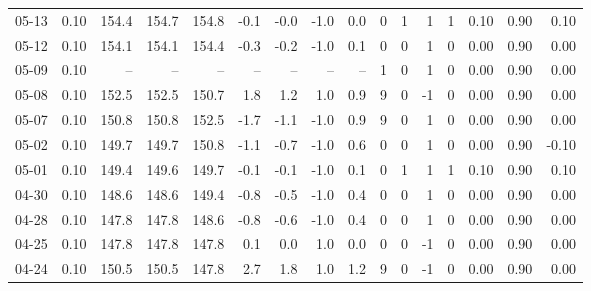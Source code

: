 \begin{threeparttable}
{\begin{tabular}{lrrrrrrrrrrrrrrr}
  05-13 &     0.10 & 154.4 & 154.7 & 154.8 &       -0.1 &           -0.0 &                     -1.0 &                 0.0 &              0 &         1 &     1 &         1 &       0.10 &      0.90 &           0.10 \\
  05-12 &     0.10 & 154.1 & 154.1 & 154.4 &       -0.3 &           -0.2 &                     -1.0 &                 0.1 &              0 &         0 &     1 &         0 &       0.00 &      0.90 &           0.00 \\
  05-09 &     0.10 &    -- &    -- &    -- &         -- &             -- &                       -- &                  -- &              1 &         0 &     1 &         0 &       0.00 &      0.90 &           0.00 \\
  05-08 &     0.10 & 152.5 & 152.5 & 150.7 &        1.8 &            1.2 &                      1.0 &                 0.9 &              9 &         0 &    -1 &         0 &       0.00 &      0.90 &           0.00 \\
  05-07 &     0.10 & 150.8 & 150.8 & 152.5 &       -1.7 &           -1.1 &                     -1.0 &                 0.9 &              9 &         0 &     1 &         0 &       0.00 &      0.90 &           0.00 \\
  05-02 &     0.10 & 149.7 & 149.7 & 150.8 &       -1.1 &           -0.7 &                     -1.0 &                 0.6 &              0 &         0 &     1 &         0 &       0.00 &      0.90 &          -0.10 \\
  05-01 &     0.10 & 149.4 & 149.6 & 149.7 &       -0.1 &           -0.1 &                     -1.0 &                 0.1 &              0 &         1 &     1 &         1 &       0.10 &      0.90 &           0.10 \\
  04-30 &     0.10 & 148.6 & 148.6 & 149.4 &       -0.8 &           -0.5 &                     -1.0 &                 0.4 &              0 &         0 &     1 &         0 &       0.00 &      0.90 &           0.00 \\
  04-28 &     0.10 & 147.8 & 147.8 & 148.6 &       -0.8 &           -0.6 &                     -1.0 &                 0.4 &              0 &         0 &     1 &         0 &       0.00 &      0.90 &           0.00 \\
  04-25 &     0.10 & 147.8 & 147.8 & 147.8 &        0.1 &            0.0 &                      1.0 &                 0.0 &              0 &         0 &    -1 &         0 &       0.00 &      0.90 &           0.00 \\
  04-24 &     0.10 & 150.5 & 150.5 & 147.8 &        2.7 &            1.8 &                      1.0 &                 1.2 &              9 &         0 &    -1 &         0 &       0.00 &      0.90 &           0.00 \\

\end{tabular}}
\end{threeparttable}

